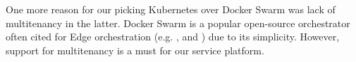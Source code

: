 One more reason for our picking Kubernetes over Docker Swarm \cite{docker-swarm} was lack of multitenancy in the latter. 
Docker Swarm is a popular open-source orchestrator often cited for Edge orchestration (e.g. \cite{bellavista2017feasibility}, and \cite{ismail2015evaluation}) due to its simplicity. However, support for multitenancy is a must for our service platform.







